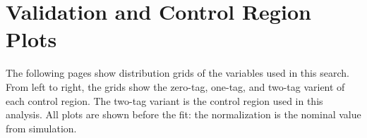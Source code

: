 \section{Validation and Control Region Plots}
\label{sec:vr_plots}

The following pages show distribution grids of the variables used in
this search. From left to right, the grids show the zero-tag, one-tag,
and two-tag varient of each control region.
The two-tag variant is the control region used in this analysis.
All plots are shown before the fit: the normalization is the nominal value from simulation.
\clearpage

\newcommand{\addvrplot}[2]{\texttt{[image: \%
int/figures/stackplots/dans/\#2]}}
\newcommand{\addpostfitetmiss}[1]{
\addvrplot{0.49}{fr_mct/#1_afterFit.pdf}
\addvrplot{0.49}{fr_mcc/#1_afterFit.pdf}
}

\newcommand{\etmisspostfitcaption}[1]{
\caption[#1\ postfit distributions for validation regions]{Post-fit distributions for \lowercase{#1}\ in \vrmct{} (left) and \vrmcc{} (right).}
}

\newcommand{\addanylep}[1]{
\addvrplot{0.32}{vr_z/#1}
\addvrplot{0.32}{vr_z_1t/#1}
\addvrplot{0.32}{cr_z/#1}\\
\addvrplot{0.32}{vr_1e/#1}
\addvrplot{0.32}{vr_1e_1t/#1}
\addvrplot{0.32}{vr_1e_2t/#1}\\
\addvrplot{0.32}{vr_1m/#1}
\addvrplot{0.32}{vr_1m_1t/#1}
\addvrplot{0.32}{vr_1m_2t/#1}\\
\addvrplot{0.32}{vr_t/#1}
\addvrplot{0.32}{vr_t_1t/#1}
\addvrplot{0.32}{cr_t/#1}
}

\newcommand{\crvrcaption}[1]{
\caption[#1\ distributions for control and validation regions]{Distributions for \lowercase{#1}\ in several regions. Top to bottom: $Z$, one $e$, one $\mu$, and $t$ regions. Right to left: 0, 1, and 2 $c$-tags}
}

\newcommand{\adddilep}[1]{
\addvrplot{0.32}{vr_z/#1}
\addvrplot{0.32}{vr_z_1t/#1}
\addvrplot{0.32}{cr_z/#1}\\
\addvrplot{0.32}{vr_t/#1}
\addvrplot{0.32}{vr_t_1t/#1}
\addvrplot{0.32}{cr_t/#1}
}

